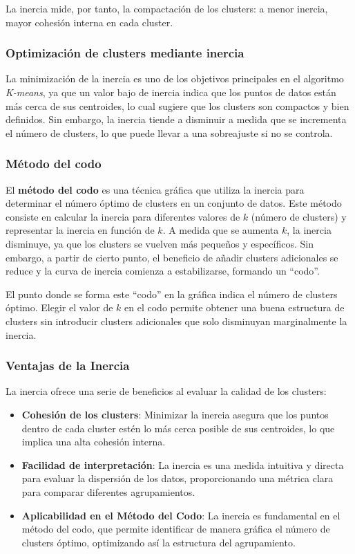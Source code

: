 La inercia mide, por tanto, la compactación de los clusters: a menor inercia, mayor cohesión interna en cada cluster.

\subsubsection{Optimización de clusters mediante inercia}

La minimización de la inercia es uno de los objetivos principales en el algoritmo \textit{K-means}, ya que un valor bajo de inercia indica que los puntos de datos están más cerca de sus centroides, lo cual sugiere que los clusters son compactos y bien definidos. Sin embargo, la inercia tiende a disminuir a medida que se incrementa el número de clusters, lo que puede llevar a una sobreajuste si no se controla.

\subsubsection{Método del codo}

El \textbf{método del codo} es una técnica gráfica que utiliza la inercia para determinar el número óptimo de clusters en un conjunto de datos. Este método consiste en calcular la inercia para diferentes valores de \(k\) (número de clusters) y representar la inercia en función de \(k\). A medida que se aumenta \(k\), la inercia disminuye, ya que los clusters se vuelven más pequeños y específicos. Sin embargo, a partir de cierto punto, el beneficio de añadir clusters adicionales se reduce y la curva de inercia comienza a estabilizarse, formando un “codo”.

El punto donde se forma este “codo” en la gráfica indica el número de clusters óptimo. Elegir el valor de \(k\) en el codo permite obtener una buena estructura de clusters sin introducir clusters adicionales que solo disminuyan marginalmente la inercia.

\subsubsection{Ventajas de la Inercia}

La inercia ofrece una serie de beneficios al evaluar la calidad de los clusters:
\begin{itemize}
    \item \textbf{Cohesión de los clusters}: Minimizar la inercia asegura que los puntos dentro de cada cluster estén lo más cerca posible de sus centroides, lo que implica una alta cohesión interna.
    \item \textbf{Facilidad de interpretación}: La inercia es una medida intuitiva y directa para evaluar la dispersión de los datos, proporcionando una métrica clara para comparar diferentes agrupamientos.
    \item \textbf{Aplicabilidad en el Método del Codo}: La inercia es fundamental en el método del codo, que permite identificar de manera gráfica el número de clusters óptimo, optimizando así la estructura del agrupamiento.
\end{itemize}

